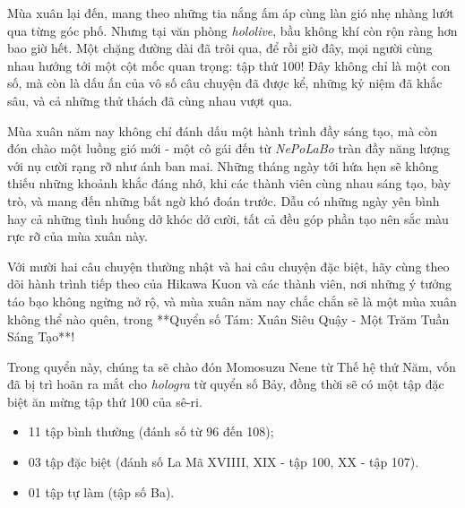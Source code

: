 \documentclass[main.tex]{subfiles}
\begin{document}
Mùa xuân lại đến, mang theo những tia nắng ấm áp cùng làn gió nhẹ nhàng lướt qua từng góc phố. Nhưng tại văn phòng \textit{hololive}, bầu không khí còn rộn ràng hơn bao giờ hết. Một chặng đường dài đã trôi qua, để rồi giờ đây, mọi người cùng nhau hướng tới một cột mốc quan trọng: tập thứ 100! Đây không chỉ là một con số, mà còn là dấu ấn của vô số câu chuyện đã được kể, những kỷ niệm đã khắc sâu, và cả những thử thách đã cùng nhau vượt qua.

Mùa xuân năm nay không chỉ đánh dấu một hành trình đầy sáng tạo, mà còn đón chào một luồng gió mới - một cô gái đến từ \textit{NePoLaBo} tràn đầy năng lượng với nụ cười rạng rỡ như ánh ban mai. Những tháng ngày tới hứa hẹn sẽ không thiếu những khoảnh khắc đáng nhớ, khi các thành viên cùng nhau sáng tạo, bày trò, và mang đến những bất ngờ khó đoán trước. Dẫu có những ngày yên bình hay cả những tình huống dở khóc dở cười, tất cả đều góp phần tạo nên sắc màu rực rỡ của mùa xuân này.

Với mười hai câu chuyện thường nhật và hai câu chuyện đặc biệt, hãy cùng theo dõi hành trình tiếp theo của Hikawa Kuon và các thành viên, nơi những ý tưởng táo bạo không ngừng nở rộ, và mùa xuân năm nay chắc chắn sẽ là một mùa xuân không thể nào quên, trong **Quyển số Tám: Xuân Siêu Quậy - Một Trăm Tuần Sáng Tạo**!

Trong quyển này, chúng ta sẽ chào đón Momosuzu Nene từ Thế hệ thứ Năm, vốn đã bị trì hoãn ra mắt cho \textit{hologra} từ quyển số Bảy, đồng thời sẽ có một tập đặc biệt ăn mừng tập thứ 100 của sê-ri.

{}
\begin{itemize}
    \item 11 tập bình thường (đánh số từ 96 đến 108);
    \item 03 tập đặc biệt (đánh số La Mã XVIIII, XIX - tập 100, XX - tập 107).
    \item 01 tập tự làm (tập số Ba).
\end{itemize}
\end{document}
